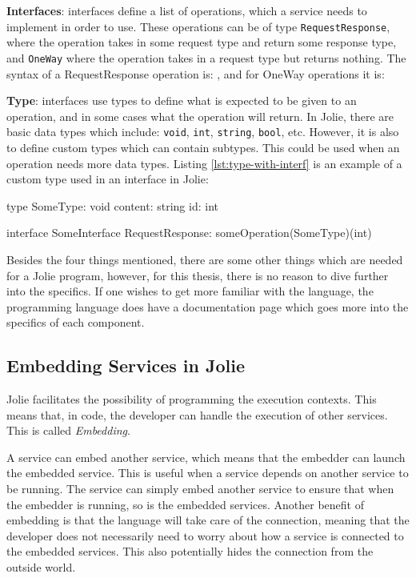 \textbf{Interfaces}: interfaces define a list of operations, which a service needs to implement in order to use. These operations can be of type \texttt{RequestResponse}, where the operation takes in some request type and return some response type, 
and \texttt{OneWay} where the operation takes in a request type but returns nothing. The syntax of a RequestResponse operation is: , and for OneWay operations it is: 

\textbf{Type}: interfaces use types to define what is expected to be given to an operation, and in some cases what the operation will return. In Jolie, there are basic
data types which include: \texttt{void}, \texttt{int}, \texttt{string}, \texttt{bool}, etc. However, it is also to define custom types which can contain subtypes.
This could be used when an operation needs more data types.
Listing \ref*{lst:type-with-interf} is an example of a custom type used in an interface in Jolie:
\begin{jolisting}[][caption={Custom type used in an interface in Jolie},label=lst:type-with-interf]
type SomeType: void {
    content: string
    id: int
}

interface SomeInterface {
    RequestResponse:
        someOperation(SomeType)(int)
}
\end{jolisting}

Besides the four things mentioned, there are some other things which are needed for a Jolie program, however, for this thesis, there is no reason to dive further into the specifics.
If one wishes to get more familiar with the language, the programming language does have a documentation page which goes more into the specifics of each component.

\subsection{Embedding Services in Jolie}
Jolie facilitates the possibility of programming the execution contexts.
This means that, in code, the developer can handle the execution of other services. This is called \textit{Embedding}.

A service can embed another service, which means that the embedder can launch the embedded service. This is useful when a service depends on another service to be running.
The service can simply embed another service to ensure that when the embedder is running, so is the embedded services.
Another benefit of embedding is that the language will take care of the connection, meaning that the developer does not necessarily need to worry about how a service is connected to the embedded services.
This also potentially hides the connection from the outside world.

